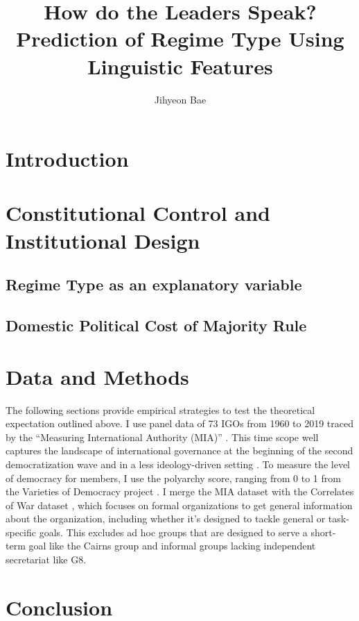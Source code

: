 \documentclass[12pt]{article}
\title{How do the Leaders Speak? Prediction of Regime Type Using Linguistic Features}
\author{Jihyeon Bae}
\date{}
\begin{document}
\maketitle

\begin{abstract}

\end{abstract}

\section{Introduction}


\section{Constitutional Control and Institutional Design}

\subsection{Regime Type as an explanatory variable}

\subsection{Domestic Political Cost of Majority Rule}

\section{Data and Methods}
The following sections provide empirical strategies to test the theoretical expectation outlined above. I use panel data of 73 IGOs from 1960 to 2019 traced by the ``Measuring International Authority (MIA)'' \parencite{hooghe2017}. This time scope well captures the landscape of international governance at the beginning of the second democratization wave and in a less ideology-driven setting \parencite{strand2012}. To measure the level of democracy for members, I use the polyarchy score, ranging from 0 to 1 from the Varieties of Democracy project \parencite{coppedge2021}. I merge the MIA dataset with the Correlates of War dataset \parencite{pevehouse2020}, which focuses on formal organizations to get general information about the organization, including whether it’s designed to tackle general or task-specific goals. This excludes ad hoc groups that are designed to serve a short-term goal like the Cairns group and informal groups lacking independent secretariat like G8.



\section{Conclusion}


\begin{appendices}



\end{appendices}
\end{document}
